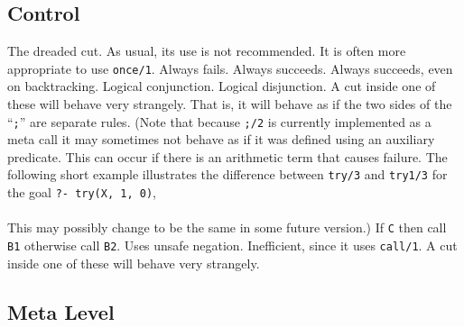 \subsection{Control}

\begin{description}
\ouritem{!}
The dreaded cut. As usual, its use is not recommended. It is often more
appropriate to use {\tt once/1}.
Always fails.
Always succeeds.
Always succeeds, even on backtracking.
Logical conjunction.
Logical disjunction. A cut inside one of these will behave very strangely.
That is, it will behave as if the two sides of the ``{\tt ;}'' 
are separate rules.
\chgbarbegin
(Note that because {\tt ;/2} is currently implemented as a meta call
it may sometimes not behave as if it was defined using an auxiliary predicate.
This can occur if there is an arithmetic term that causes failure.
The following short example illustrates the difference between
{\tt try/3} and {\tt try1/3} for the goal {\tt ?- try(X, 1, 0)}, \\
\\
This may possibly change to be the same in some future version.)
\chgbarend
{}
If {\tt C} then call {\tt B1} otherwise call {\tt B2}. Uses unsafe negation.
Inefficient, since it uses {\tt call/1}. A cut inside one of these will behave
very strangely.
\end{description}

\subsection{Meta Level}

